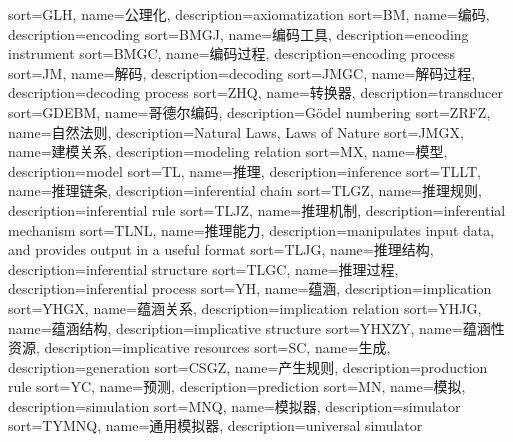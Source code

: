 {
  sort=GLH,
  name=公理化,
  description={axiomatization}
}
{
  sort=BM,
  name=编码,
  description={encoding}
}
{
  sort=BMGJ,
  name=编码工具,
  description={encoding instrument}
}
{
  sort=BMGC,
  name=编码过程,
  description={encoding process}
}
{
  sort=JM,
  name=解码,
  description={decoding}
}
{
  sort=JMGC,
  name=解码过程,
  description={decoding process}
}
{
  sort=ZHQ,
  name=转换器,
  description={transducer}
}
{
  sort=GDEBM,
  name=哥德尔编码,
  description={G{\"o}del numbering}
}
{
  sort=ZRFZ,
  name=自然法则,
  description={Natural Laws, Laws of Nature}
}
{
  sort=JMGX,
  name=建模关系,
  description={modeling relation}
}
{
  sort=MX,
  name=模型,
  description={model}
}
{
  sort=TL,
  name=推理,
  description={inference}
}
{
  sort=TLLT,
  name=推理链条,
  description={inferential chain}
}
{
  sort=TLGZ,
  name=推理规则,
  description={inferential rule}
}
{
  sort=TLJZ,
  name=推理机制,
  description={inferential mechanism}
}
{
  sort=TLNL,
  name=推理能力,
  description={manipulates input data, and provides output in a useful format}
}
{
  sort=TLJG,
  name=推理结构,
  description={inferential structure}
}
{
  sort=TLGC,
  name=推理过程,
  description={inferential process}
}
{
  sort=YH,
  name=蕴涵,
  description={implication}
}
{
  sort=YHGX,
  name=蕴涵关系,
  description={implication relation}
}
{
  sort=YHJG,
  name=蕴涵结构,
  description={implicative structure}
}
{
  sort=YHXZY,
  name=蕴涵性资源,
  description={implicative resources}
}
{
  sort=SC,
  name=生成,
  description={generation}
}
{
  sort=CSGZ,
  name=产生规则,
  description={production rule}
}
{
  sort=YC,
  name=预测,
  description={prediction}
}
{
  sort=MN,
  name=模拟,
  description={simulation}
}
{
  sort=MNQ,
  name=模拟器,
  description={simulator}
}
{
  sort=TYMNQ,
  name=通用模拟器,
  description={universal simulator}
}
